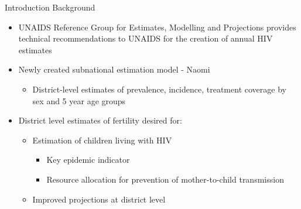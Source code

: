 \documentclass[ignorenonframetext,]{beamer}
\providecommand{\tightlist}{%
  \setlength{\itemsep}{0pt}\setlength{\parskip}{0pt}}
\begin{document}
\begin{frame}[t]{Introduction \textbar{} Background}
\protect\hypertarget{introduction-background-2}{}

\begin{itemize}
\tightlist
\item
  UNAIDS Reference Group for Estimates, Modelling and Projections
  provides technical recommendations to UNAIDS for the creation of
  annual HIV estimates
\item
  Newly created subnational estimation model - Naomi

  \begin{itemize}
  \tightlist
  \item
    District-level estimates of prevalence, incidence, treatment
    coverage by sex and 5 year age groups
  \end{itemize}
\item
  District level estimates of fertility desired for:

  \begin{itemize}
  \tightlist
  \item
    Estimation of children living with HIV

    \begin{itemize}
    \tightlist
    \item
      Key epidemic indicator
    \item
      Resource allocation for prevention of mother-to-child transmission
    \end{itemize}
  \item
    Improved projections at district level
  \end{itemize}
\end{itemize}

\end{frame}
\end{document}
